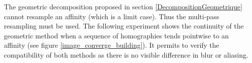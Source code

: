 The geometric decomposition proposed in section \ref{DecompositionGeometrique} cannot resample an affinity (which is a limit case). Thus the multi-pass resampling must be used. The following experiment shows the continuity of the geometric method when a sequence of homographies tends pointwise to an affinity (see figure \ref{image_converge_building}). It permits to verify the compatibility of both methods as there is no visible difference in blur or aliasing.
\begin{figure}[h!]
	\centering
\end{figure}
